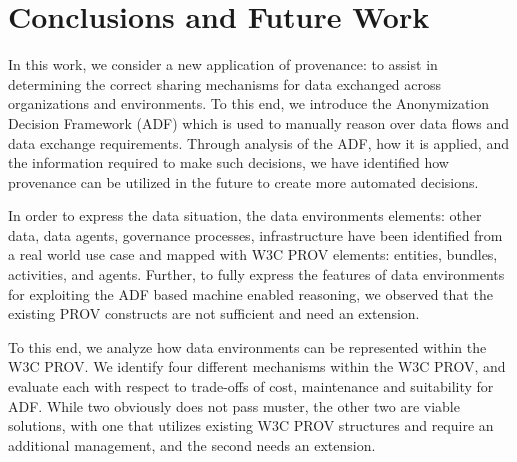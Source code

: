 \section{Conclusions and Future Work} \label{sec:concl}

In this work, we consider a new application of provenance: to assist in determining the correct sharing mechanisms for data exchanged across organizations and environments. To this end, we introduce the Anonymization Decision Framework (ADF) which is used to manually reason over data flows and data exchange requirements. Through analysis of the ADF, how it is applied, and the information required to make such decisions, we have identified how provenance can be utilized in the future to create more automated decisions.

 In order to express the data situation, the data environments elements: other data, data agents, governance processes, infrastructure have been identified from a real world use case and mapped with W3C PROV elements: entities, bundles, activities, and agents. Further, to fully express the features of data environments for exploiting the ADF based machine enabled reasoning, we observed that the existing PROV constructs are not sufficient and need an extension. 
 
To this end, we analyze how data environments can be represented within the W3C PROV. We identify four different mechanisms within the W3C PROV, and evaluate each with respect to trade-offs of cost, maintenance and suitability for ADF. While two obviously does not pass muster, the other two are viable solutions, with one that utilizes existing W3C PROV structures and require an additional management, and the  second needs an extension.